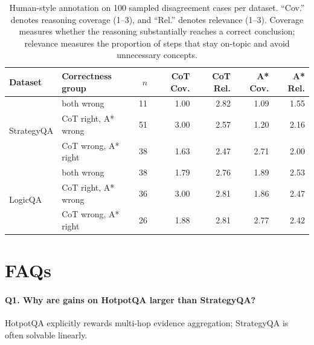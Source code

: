 \documentclass[10pt]{article}
\begin{document}
\begin{table}[t]
\centering
\small
\begin{tabular}{llrrrrr}
\toprule
Dataset & Correctness group & $n$ & CoT Cov. & CoT Rel. & A* Cov. & A* Rel. \\
\midrule
\multirow{3}{*}{StrategyQA}
& both wrong            & 11 & 1.00 & 2.82 & 1.09 & 1.55 \\
& CoT right, A* wrong   & 51 & 3.00 & 2.57 & 1.20 & 2.16 \\
& CoT wrong, A* right   & 38 & 1.63 & 2.47 & 2.71 & 2.00 \\
\midrule
\multirow{3}{*}{LogicQA}
& both wrong            & 38 & 1.79 & 2.76 & 1.89 & 2.53 \\
& CoT right, A* wrong   & 36 & 3.00 & 2.81 & 1.86 & 2.47 \\
& CoT wrong, A* right   & 26 & 1.88 & 2.81 & 2.77 & 2.42 \\
\bottomrule
\end{tabular}
\caption{Human-style annotation on 100 sampled disagreement cases per dataset. “Cov.” denotes reasoning coverage (1--3), and “Rel.” denotes relevance (1--3). Coverage measures whether the reasoning substantially reaches a correct conclusion; relevance measures the proportion of steps that stay on-topic and avoid unnecessary concepts.}
\label{tab:disagreement-human-eval}
\end{table}








\section{FAQs}
\label{app:faqs}

\paragraph{Q1. Why are gains on HotpotQA larger than StrategyQA?}
HotpotQA explicitly rewards multi-hop evidence aggregation; StrategyQA is often solvable linearly.
\end{document}
